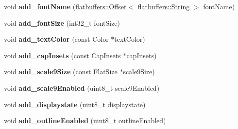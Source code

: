 \begin{DoxyCompactItemize}
\item 
\mbox{\label{structflatbuffers_1_1ButtonOptionsBuilder_aaf49ecd246c6aaf3cf56a9e94da1dfa4}} 
void {\bfseries add\+\_\+font\+Name} (\hyperlink{structflatbuffers_1_1Offset}{flatbuffers\+::\+Offset}$<$ \hyperlink{structflatbuffers_1_1String}{flatbuffers\+::\+String} $>$ font\+Name)
\item 
\mbox{\label{structflatbuffers_1_1ButtonOptionsBuilder_af3706ffc6e93e52b12b9b454022ba517}} 
void {\bfseries add\+\_\+font\+Size} (int32\+\_\+t font\+Size)
\item 
\mbox{\label{structflatbuffers_1_1ButtonOptionsBuilder_aba57e003116e6c94a43265a7163b3203}} 
void {\bfseries add\+\_\+text\+Color} (const Color $\ast$text\+Color)
\item 
\mbox{\label{structflatbuffers_1_1ButtonOptionsBuilder_a7ab0e75806b80935ebe7dc4524e7952a}} 
void {\bfseries add\+\_\+cap\+Insets} (const Cap\+Insets $\ast$cap\+Insets)
\item 
\mbox{\label{structflatbuffers_1_1ButtonOptionsBuilder_a0471e4baf6093a1ef342deb3a60ab1b8}} 
void {\bfseries add\+\_\+scale9\+Size} (const Flat\+Size $\ast$scale9\+Size)
\item 
\mbox{\label{structflatbuffers_1_1ButtonOptionsBuilder_a01f51eb8393c6ac9b3e3ff91955cc0ea}} 
void {\bfseries add\+\_\+scale9\+Enabled} (uint8\+\_\+t scale9\+Enabled)
\item 
\mbox{\label{structflatbuffers_1_1ButtonOptionsBuilder_af0347b72c4c195ed667dd64f118992ad}} 
void {\bfseries add\+\_\+displaystate} (uint8\+\_\+t displaystate)
\item 
\mbox{\label{structflatbuffers_1_1ButtonOptionsBuilder_ae60679e655f7df8f98ff89aebc704edd}} 
void {\bfseries add\+\_\+outline\+Enabled} (uint8\+\_\+t outline\+Enabled)
\item 
\mbox{\label{structflatbuffers_1_1ButtonOptionsBuilder_a4b60c37b519e7fbf4a3de95cbfeb5f2a}} 

\end{DoxyCompactItemize}
